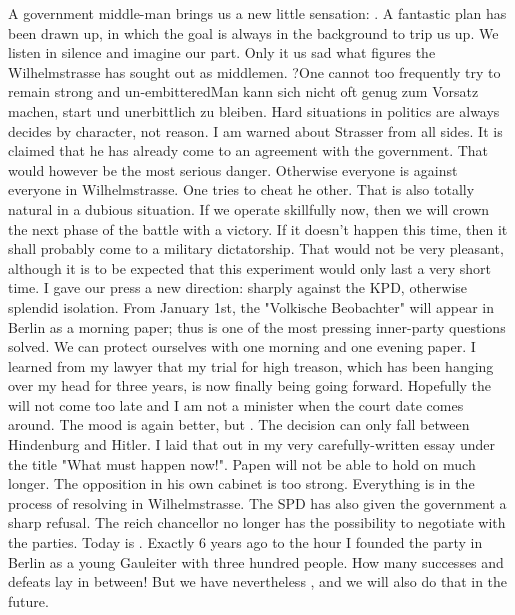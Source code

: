 
A government middle-man brings us a new little sensation: . A fantastic plan has been drawn up, in which the goal is always in the background to trip us up. We listen in silence and imagine our part. Only it us sad what figures the Wilhelmstrasse has sought out as middlemen. ?{One cannot too frequently try to remain strong and un-embittered}{Man kann sich nicht oft genug zum Vorsatz machen, start und unerbittlich zu bleiben}. Hard situations in politics are always decides by character, not reason. I am warned about Strasser from all sides. It is claimed that he has already come to an agreement with the government. That would however be the most serious danger. Otherwise everyone is against everyone in Wilhelmstrasse. One tries to cheat he other. That is also totally natural in a dubious situation. If we operate skillfully now, then we will crown the next phase of the battle with a victory. If it doesn't happen this time, then it shall probably come to a military dictatorship. That would not be very pleasant, although it is to be expected that this experiment would only last a very short time. I gave our press a new direction: sharply against the KPD, otherwise splendid isolation. From January 1st, the "Volkische Beobachter" will appear in Berlin as a morning paper; thus is one of the most pressing inner-party questions solved. We can protect ourselves with one morning and one  evening paper. I learned from my lawyer that my trial for high treason, which has been hanging over my head for three years, is now finally being going forward. Hopefully the  will not come too late and I am not a minister when the court date comes around. The mood is again better, but . The decision can only fall between Hindenburg and Hitler. I laid that out in my very carefully-written essay under the title "What must happen now!". Papen will not be able to hold on much longer. The opposition in his own cabinet is too strong. Everything is in the process of resolving in Wilhelmstrasse. The SPD has also given the government a sharp refusal. The reich chancellor no longer has the possibility to negotiate with the parties. Today is . Exactly 6 years ago to the hour I founded the party in Berlin as a young Gauleiter with three hundred people. How many successes and defeats lay in between! But we have nevertheless , and we will also do that in the future.
% 